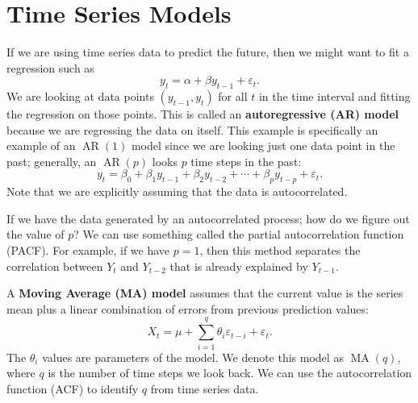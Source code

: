\section{Time Series Models}
If we are using time series data to predict the future, then we might want to fit a regression such as $$ y_t = \alpha + \beta y_{t-1} + \varepsilon_t. $$ We are looking at data points $(y_{t-1},y_t)$ for all $t$ in the time interval and fitting the regression on those points. This is called an \textbf{autoregressive (AR) model} because we are regressing the data on itself. This example is specifically an example of an $\operatorname{AR}(1)$ model since we are looking just one data point in the past; generally, an $\operatorname{AR}(p)$ looks $p$ time steps in the past: $$ y_t = \beta_0 + \beta_1 y_{t-1} + \beta_2 y_{t-2} + \cdots + \beta_p y_{t-p} + \varepsilon_t. $$ Note that we are explicitly assuming that the data is autocorrelated.

If we have the data generated by an autocorrelated process; how do we figure out the value of $p$? We can use something called the partial autocorrelation function (PACF). For example, if we have $p=1$, then this method separates the correlation between $Y_t$ and $Y_{t-2}$ that is already explained by $Y_{t-1}$.

A \textbf{Moving Average (MA) model} assumes that the current value is the series mean plus a linear combination of errors from previous prediction values: $$ X_t = \mu + \sum_{i=1}^q \theta_i\varepsilon_{t-i} + \varepsilon_t. $$ The $\theta_i$ values are parameters of the model. We denote this model as $\operatorname{MA}(q)$, where $q$ is the number of time steps we look back. We can use the autocorrelation function (ACF) to identify $q$ from time series data.

